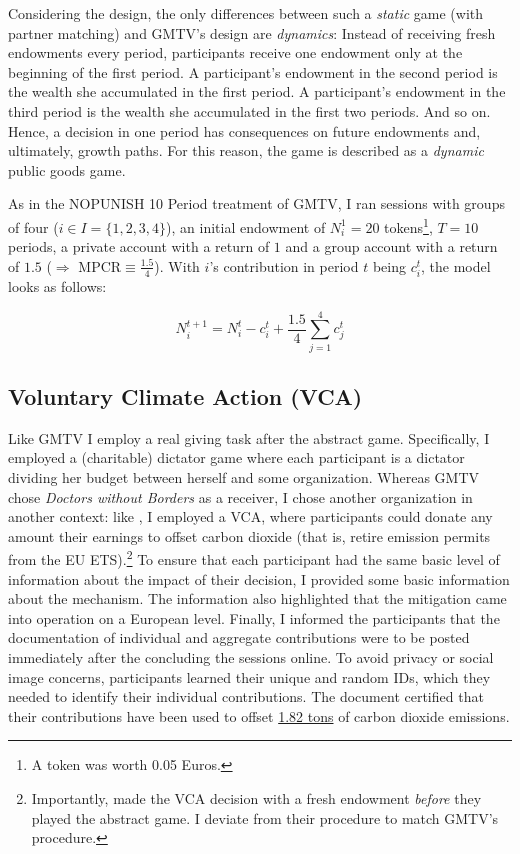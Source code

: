 \documentclass[
  authoryear,
  preprint,
  3p]{elsarticle}
\begin{document}
Considering the design, the only differences between such a
\emph{static} game (with partner matching) and GMTV's design are
\emph{dynamics}: Instead of receiving fresh endowments every period,
participants receive one endowment only at the beginning of the first
period. A participant's endowment in the second period is the wealth she
accumulated in the first period. A participant's endowment in the third
period is the wealth she accumulated in the first two periods. And so
on. Hence, a decision in one period has consequences on future
endowments and, ultimately, growth paths. For this reason, the game is
described as a \emph{dynamic} public goods game.

As in the NOPUNISH 10 Period treatment of GMTV, I ran sessions with
groups of four (\(i \in I=\{1,2,3,4\}\)), an initial endowment of
\(N_i^1 = 20\) tokens\footnote{A token was worth 0.05 Euros.}, \(T=10\)
periods, a private account with a return of \(1\) and a group account
with a return of \(1.5\) (\(\Rightarrow\) MPCR\(\equiv \frac{1.5}{4}\)).
With \(i\)'s contribution in period \(t\) being \(c_i^t\), the model
looks as follows:

\[
N_i^{t+1}=N_i^t - c_i^t + \frac{1.5}{4}\sum_{j=1}^4 c_j^t
\]

\hypertarget{voluntary-climate-action-vca}{%
\subsection{Voluntary Climate Action
(VCA)}\label{voluntary-climate-action-vca}}

Like GMTV I employ a real giving task after the abstract game.
Specifically, I employed a (charitable) dictator game where each
participant is a dictator dividing her budget between herself and some
organization. Whereas GMTV chose \emph{Doctors without Borders} as a
receiver, I chose another organization in another context: like
\citet{GKLS2020}, I employed a VCA, where participants could donate any
amount their earnings to offset carbon dioxide (that is, retire emission
permits from the EU ETS).\footnote{Importantly, \citet{GKLS2020} made
  the VCA decision with a fresh endowment \emph{before} they played the
  abstract game. I deviate from their procedure to match GMTV's
  procedure.} To ensure that each participant had the same basic level
of information about the impact of their decision, I provided some basic
information about the mechanism. The information also highlighted that
the mitigation came into operation on a European level. Finally, I
informed the participants that the documentation of individual and
aggregate contributions were to be posted immediately after the
concluding the sessions online. To avoid privacy or social image
concerns, participants learned their unique and random IDs, which they
needed to identify their individual contributions. The document
certified that their contributions have been used to offset
\href{https://www.compensators.org/compensatelist/?searchterm=stefan+traub}{1.82
tons} of carbon dioxide emissions.
\end{document}
